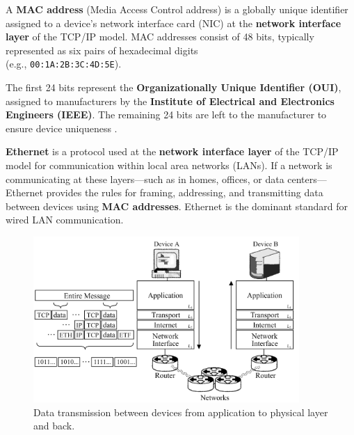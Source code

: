 \begin{Def}

    A \textbf{MAC address} (Media Access Control address) is a globally unique identifier assigned to a device's network interface card (NIC) at the \textbf{network interface layer} of the TCP/IP model. 
    MAC addresses consist of 48 bits, typically represented as six pairs of hexadecimal digits\\
    (e.g., \texttt{00:1A:2B:3C:4D:5E}).

    The first 24 bits represent the \textbf{Organizationally Unique Identifier (OUI)}, assigned to manufacturers by the \textbf{Institute of Electrical and Electronics Engineers (IEEE)}.
    The remaining 24 bits are left to the manufacturer to ensure device uniqueness \cite{ieee8022001}.
\end{Def}
    

\begin{Def}[Ethernet]

    \textbf{Ethernet} is a protocol used at the \textbf{network interface layer} of the TCP/IP model for communication within local area networks (LANs).
    If a network is communicating at these layers—such as in homes, offices, or data centers—Ethernet provides the rules for framing, addressing, and transmitting data between devices using \textbf{MAC addresses}. 
    Ethernet is the dominant standard for wired LAN communication. \hfill \cite{9844436}

\end{Def}

\vspace{-1em}
\begin{figure}[h]
    \hspace{1em}
    \includegraphics[width=0.9\textwidth]{Sections/network/tcpip.png}
    \caption{Data transmission between devices from application to physical layer and back.}
    \label{fig:tcpip}
\end{figure}

